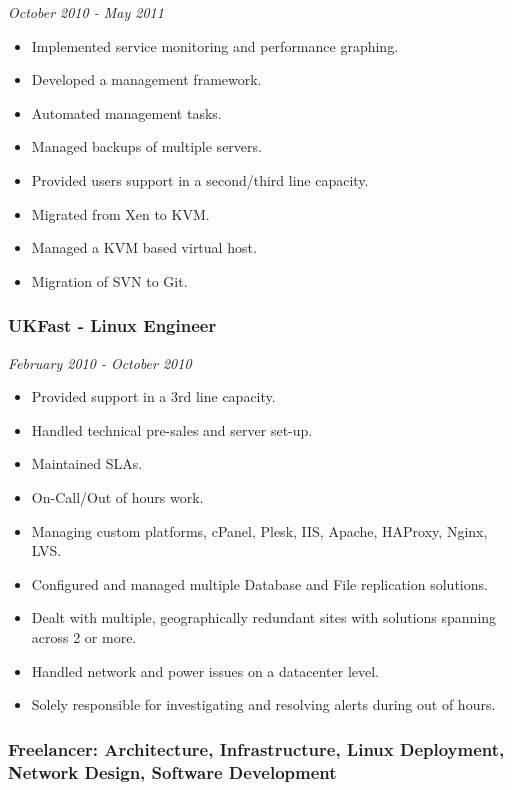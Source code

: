 \emph{October 2010 - May 2011}

\begin{itemize}
\tightlist
\item
  Implemented service monitoring and performance graphing.
\item
  Developed a management framework.
\item
  Automated management tasks.
\item
  Managed backups of multiple servers.
\item
  Provided users support in a second/third line capacity.
\item
  Migrated from Xen to KVM.
\item
  Managed a KVM based virtual host.
\item
  Migration of SVN to Git.
\end{itemize}

\subsubsection{UKFast - Linux Engineer}\label{ukfast---linux-engineer}

\emph{February 2010 - October 2010}

\begin{itemize}
\tightlist
\item
  Provided support in a 3rd line capacity.
\item
  Handled technical pre-sales and server set-up.
\item
  Maintained SLAs.
\item
  On-Call/Out of hours work.
\item
  Managing custom platforms, cPanel, Plesk, IIS, Apache, HAProxy, Nginx,
  LVS.
\item
  Configured and managed multiple Database and File replication
  solutions.
\item
  Dealt with multiple, geographically redundant sites with solutions
  spanning across 2 or more.
\item
  Handled network and power issues on a datacenter level.
\item
  Solely responsible for investigating and resolving alerts during out
  of hours.
\end{itemize}

\subsubsection{Freelancer: Architecture, Infrastructure, Linux
Deployment, Network Design, Software
Development}\label{freelancer-architecture-infrastructure-linux-deployment-network-design-software-development}

